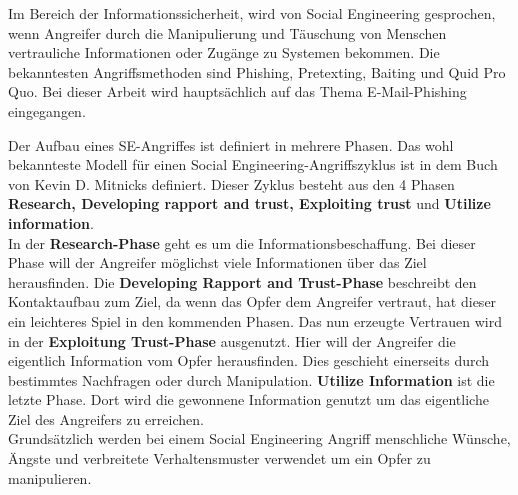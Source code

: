 	Im Bereich der Informationssicherheit, wird von Social Engineering gesprochen, wenn Angreifer durch die Manipulierung und Täuschung von Menschen vertrauliche Informationen oder Zugänge zu Systemen bekommen. Die bekanntesten Angriffsmethoden sind Phishing, Pretexting, Baiting und Quid Pro Quo. Bei dieser Arbeit wird hauptsächlich auf das Thema E-Mail-Phishing eingegangen.

	Der Aufbau eines SE-Angriffes ist definiert in mehrere Phasen. Das wohl bekannteste Modell für einen Social Engineering-Angriffszyklus ist in dem Buch von Kevin D. Mitnicks \cite{ArtOfDeception} definiert. Dieser Zyklus besteht aus den 4 Phasen \textbf{Research, Developing rapport and trust, Exploiting trust} und \textbf{Utilize information}.\\
	In der \textbf{Research-Phase} geht es um die Informationsbeschaffung. Bei dieser Phase will der Angreifer möglichst viele Informationen über das Ziel herausfinden. Die \textbf{Developing Rapport and Trust-Phase} beschreibt den Kontaktaufbau zum Ziel, da wenn das Opfer dem Angreifer vertraut, hat dieser ein leichteres Spiel in den kommenden Phasen. Das nun erzeugte Vertrauen wird in der \textbf{Exploitung Trust-Phase} ausgenutzt. Hier will der Angreifer die eigentlich Information vom Opfer herausfinden. Dies geschieht einerseits durch bestimmtes Nachfragen oder durch Manipulation.
	\textbf{Utilize Information} ist die letzte Phase. Dort wird die gewonnene Information genutzt um das eigentliche Ziel des Angreifers zu erreichen.\\
	Grundsätzlich werden bei einem Social Engineering Angriff menschliche Wünsche, Ängste und verbreitete Verhaltensmuster verwendet um ein Opfer zu manipulieren.\cite{LeitfadenSE}\\

